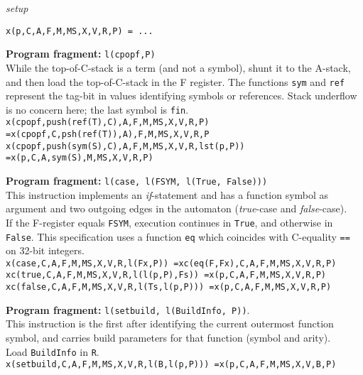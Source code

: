 \documentclass[11pt,twoside]{memoir}
\def\E{\emph} %
\def\I{\textit} %
\def\T{\texttt}
\def\B{\textbf}
\def\rhs{\newline\noindent\phantom{x}\hspace{5ex}}
\begin{document}
\begin{description}[style=nextline]
	\item[] \centerline{\I{setup}}
										\T{x(p,C,A,F,M,MS,X,V,R,P) = ...}
	\item[cpopf] 
	\B{Program fragment:} \T{l(cpopf,P)}\\
	While the top-of-C-stack is a term (and not a symbol), shunt it to the A-stack, and then load the top-of-C-stack in the F register. The functions \T{sym} and \T{ref} represent the tag-bit in values identifying symbols or references. Stack underflow is no concern here; the last symbol is \T{fin}.\\
		\T{x(cpopf,push(ref(T),C),A,F,M,MS,X,V,R,P) =\rhs x(cpopf,C,psh(ref(T)),A),F,M,MS,X,V,R,P}\\
		\T{x(cpopf,push(sym(S),C),A,F,M,MS,X,V,R,lst(p,P)) =\rhs x(p,C,A,sym(S),M,MS,X,V,R,P)}
	\item[case] 
	\B{Program fragment:} \T{l(case, l(FSYM, l(True, False)))}\\
	This instruction implements an \E{if}-statement and has a function symbol as argument and two outgoing edges in the automaton (\E{true}-case and \E{false}-case).\\
	If the F-register equals \T{FSYM}, execution continues in \T{True}, and otherwise in \T{False}. This specification uses a function \T{eq} which coincides with C-equality \T{==} on 32-bit integers.\\
		\T{x(case,C,A,F,M,MS,X,V,R,l(Fx,P)) =\rhs xc(eq(F,Fx),C,A,F,M,MS,X,V,R,P)}\\
		\T{xc(true,C,A,F,M,MS,X,V,R,l(l(p,P),Fs)) =\rhs x(p,C,A,F,M,MS,X,V,R,P)}\\
		\T{xc(false,C,A,F,M,MS,X,V,R,l(Ts,l(p,P))) =\rhs x(p,C,A,F,M,MS,X,V,R,P)}\\
	\item[setbuild]
	\B{Program fragment:} \T{l(setbuild, l(BuildInfo, P))}.\\
	This instruction is the first after identifying the current outermost function symbol, and carries build parameters for that function (symbol and arity). \\
	Load \T{BuildInfo} in \T{R}.\\
		\T{x(setbuild,C,A,F,M,MS,X,V,R,l(B,l(p,P))) =\rhs x(p,C,A,F,M,MS,X,V,B,P)}
	

\end{description}
\end{document}
